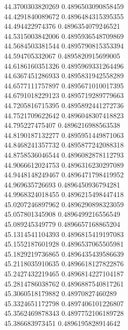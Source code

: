 {44.3700303820269 0.4896503090858459
 \\
44.4291840089672 0.4896484315395355
 \\
44.494422974376 0.4896354079246521
 \\
44.5315003842006 0.4895936548709869
 \\
44.5684503381544 0.4895790815353394
 \\
44.594705332067 0.4895820915699005
 \\
44.6186160351326 0.4895969331264496
 \\
44.6367451286933 0.4895831942558289
 \\
44.6577111757897 0.4895671010017395
 \\
44.6791018229123 0.4895719289779663
 \\
44.7205816715395 0.4895892441272736
 \\
44.7521709622642 0.4896048307418823
 \\
44.795227475407 0.4896216988563538
 \\
44.8190187132277 0.4895951449871063
 \\
44.8468241357732 0.4895877242088318
 \\
44.8758536046544 0.4896082878112793
 \\
44.9066612024753 0.4896316230297089
 \\
44.9448148249467 0.4896471798419952
 \\
44.969635726693 0.4896450936794281
 \\
44.9968324018455 0.4896215498447418
 \\
45.0207246897962 0.4896290898323059
 \\
45.057801345908 0.4896499216556549
 \\
45.089245349779 0.4896657168865204
 \\
45.1314541104393 0.4896815419197083
 \\
45.1552187601928 0.4896537065505981
 \\
45.1829219736865 0.4896435439586639
 \\
45.2118035910635 0.4896618127822876
 \\
45.2427432219465 0.4896814227104187
 \\
45.2814786038762 0.4896887540817261
 \\
45.3060518179882 0.48970827460289
 \\
45.3324651172798 0.4897406101226807
 \\
45.3562469878343 0.4897752106189728
 \\
45.386683973451 0.4896195828914642
 \\
}
